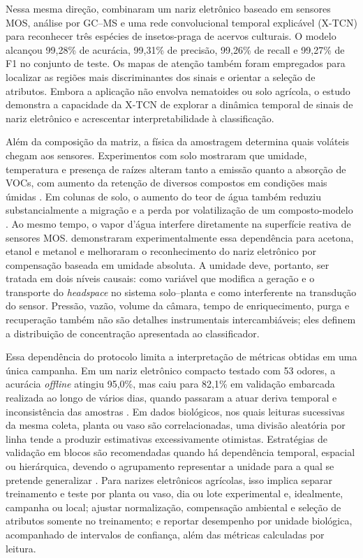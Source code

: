 \documentclass[12pt,a4paper]{article}
\begin{document}
Nessa mesma direção, \citet{chen2026xtcn} combinaram um nariz eletrônico baseado em sensores MOS, análise por GC--MS e uma rede convolucional temporal explicável (X-TCN) para reconhecer três espécies de insetos-praga de acervos culturais. O modelo alcançou 99,28\% de acurácia, 99,31\% de precisão, 99,26\% de recall e 99,27\% de F1 no conjunto de teste. Os mapas de atenção também foram empregados para localizar as regiões mais discriminantes dos sinais e orientar a seleção de atributos. Embora a aplicação não envolva nematoides ou solo agrícola, o estudo demonstra a capacidade da X-TCN de explorar a dinâmica temporal de sinais de nariz eletrônico e acrescentar interpretabilidade à classificação.

Além da composição da matriz, a física da amostragem determina quais voláteis chegam aos sensores. Experimentos com solo mostraram que umidade, temperatura e presença de raízes alteram tanto a emissão quanto a absorção de VOCs, com aumento da retenção de diversos compostos em condições mais úmidas \cite{asensio2007}. Em colunas de solo, o aumento do teor de água também reduziu substancialmente a migração e a perda por volatilização de um composto-modelo \cite{sun2023}. Ao mesmo tempo, o vapor d'água interfere diretamente na superfície reativa de sensores MOS. \citet{yan2021} demonstraram experimentalmente essa dependência para acetona, etanol e metanol e melhoraram o reconhecimento do nariz eletrônico por compensação baseada em umidade absoluta. A umidade deve, portanto, ser tratada em dois níveis causais: como variável que modifica a geração e o transporte do \textit{headspace} no sistema solo--planta e como interferente na transdução do sensor. Pressão, vazão, volume da câmara, tempo de enriquecimento, purga e recuperação também não são detalhes instrumentais intercambiáveis; eles definem a distribuição de concentração apresentada ao classificador.

Essa dependência do protocolo limita a interpretação de métricas obtidas em uma única campanha. Em um nariz eletrônico compacto testado com 53 odores, a acurácia \textit{offline} atingiu 95,0\%, mas caiu para 82,1\% em validação embarcada realizada ao longo de vários dias, quando passaram a atuar deriva temporal e inconsistência das amostras \cite{sun2025enose}. Em dados biológicos, nos quais leituras sucessivas da mesma coleta, planta ou vaso são correlacionadas, uma divisão aleatória por linha tende a produzir estimativas excessivamente otimistas. Estratégias de validação em blocos são recomendadas quando há dependência temporal, espacial ou hierárquica, devendo o agrupamento representar a unidade para a qual se pretende generalizar \cite{roberts2017}. Para narizes eletrônicos agrícolas, isso implica separar treinamento e teste por planta ou vaso, dia ou lote experimental e, idealmente, campanha ou local; ajustar normalização, compensação ambiental e seleção de atributos somente no treinamento; e reportar desempenho por unidade biológica, acompanhado de intervalos de confiança, além das métricas calculadas por leitura.
\end{document}
